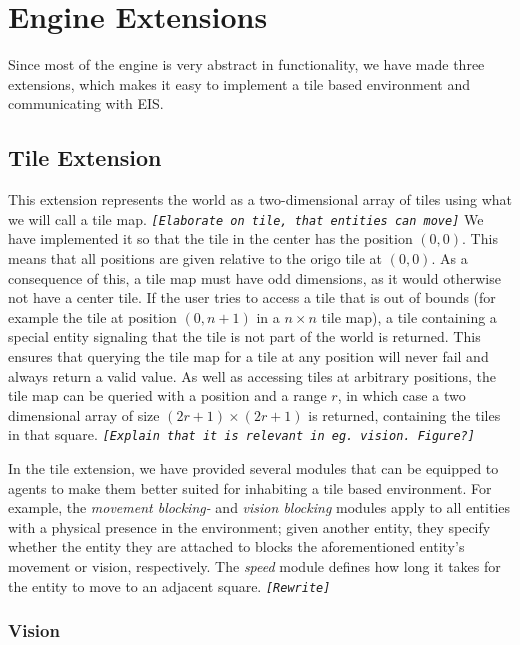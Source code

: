 
\section{Engine Extensions}

Since most of the engine is very abstract in functionality, we have
made three extensions, which makes it easy to implement a tile based
environment and communicating with EIS.


\subsection{Tile Extension}

This extension represents the world as a two-dimensional array of
tiles using what we will call a tile map. \texttt{\emph{{[}Elaborate
on tile, that entities can move{]}}} We have implemented it so that
the tile in the center has the position $(0,0)$. This means that
all positions are given relative to the origo tile at $(0,0)$. As
a consequence of this, a tile map must have odd dimensions, as it
would otherwise not have a center tile. If the user tries to access
a tile that is out of bounds (for example the tile at position $(0,n+1)$
in a $n\times n$ tile map), a tile containing a special entity signaling
that the tile is not part of the world is returned. This ensures that
querying the tile map for a tile at any position will never fail and
always return a valid value. As well as accessing tiles at arbitrary
positions, the tile map can be queried with a position and a range
$r$, in which case a two dimensional array of size $(2r+1)\times(2r+1)$
is returned, containing the tiles in that square. \texttt{\emph{{[}Explain
that it is relevant in eg. vision. Figure?{]}}}

In the tile extension, we have provided several modules that can be
equipped to agents to make them better suited for inhabiting a tile
based environment. For example, the \emph{movement blocking-} and
\emph{vision blocking} modules apply to all entities with a physical
presence in the environment; given another entity, they specify whether
the entity they are attached to blocks the aforementioned entity's
movement or vision, respectively. The \emph{speed} module defines
how long it takes for the entity to move to an adjacent square. \texttt{\emph{{[}Rewrite{]}}}


\subsubsection*{Vision}

